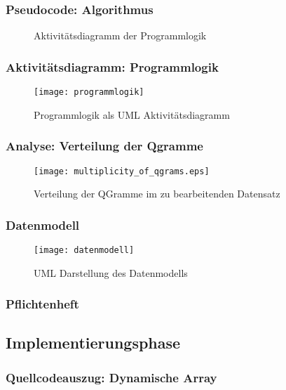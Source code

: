 \subsubsection{Pseudocode: Algorithmus}
\begin{figure}[!htp]
	\caption{Aktivitätsdiagramm der Programmlogik}
	\label{listing:pseudocode}
	
	\centering
\end{figure}
\subsubsection{Aktivitätsdiagramm: Programmlogik}
\begin{figure}[!htp]
	\caption{Programmlogik als UML Aktivitätsdiagramm}
	\label{fig:programmlogik}
	\texttt{[image: programmlogik]}
	\centering
\end{figure}

\subsubsection{Analyse: Verteilung der Qgramme}
\begin{figure}[!htp]
    \caption{Verteilung der QGramme im zu bearbeitenden Datensatz}
    \label{fig:qgram_verteilung}
    \texttt{[image: multiplicity\_of\_qgrams.eps]}
    \centering
\end{figure}

\subsubsection{Datenmodell}
\begin{figure}[!htp]
    \caption{UML Darstellung des Datenmodells}
    \label{fig:datenmodell}
    \texttt{[image: datenmodell]}
    \centering
\end{figure}

\subsubsection{Pflichtenheft}

\subsection{Implementierungsphase}
\subsubsection{Quellcodeauszug: Dynamische Array}



